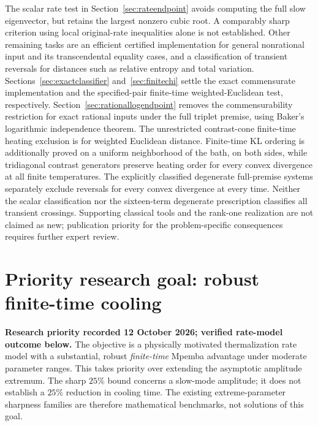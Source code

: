 \documentclass[11pt]{article}
\begin{document}
The scalar rate test in Section~\ref{sec:rateendpoint} avoids computing the full slow eigenvector, but retains the largest nonzero cubic root. A comparably sharp criterion using local original-rate inequalities alone is not established. Other remaining tasks are an efficient certified implementation for general nonrational input and its transcendental equality cases, and a classification of transient reversals for distances such as relative entropy and total variation. Sections~\ref{sec:exactclassifier} and~\ref{sec:finitechi} settle the exact commensurate implementation and the specified-pair finite-time weighted-Euclidean test, respectively. Section~\ref{sec:rationallogendpoint} removes the commensurability restriction for exact rational inputs under the full triplet premise, using Baker's logarithmic independence theorem. The unrestricted contrast-cone finite-time heating exclusion is for weighted Euclidean distance. Finite-time KL ordering is additionally proved on a uniform neighborhood of the bath, on both sides, while tridiagonal contrast generators preserve heating order for every convex divergence at all finite temperatures. The explicitly classified degenerate full-premise systems separately exclude reversals for every convex divergence at every time. Neither the scalar classification nor the sixteen-term degenerate prescription classifies all transient crossings. Supporting classical tools and the rank-one realization are not claimed as new; publication priority for the problem-specific consequences requires further expert review.

\section{Priority research goal: robust finite-time cooling}
\label{sec:physicalfinitetimegoal}
\textbf{Research priority recorded 12 October 2026; verified rate-model outcome below.}
The objective is a physically motivated thermalization rate model with a
substantial, robust \emph{finite-time} Mpemba advantage under moderate parameter
ranges. This takes priority over extending the asymptotic amplitude extremum.
The sharp $25\%$ bound concerns a slow-mode amplitude; it does not establish
a $25\%$ reduction in cooling time. The existing extreme-parameter sharpness
families are therefore mathematical benchmarks, not solutions of this goal.
\end{document}
